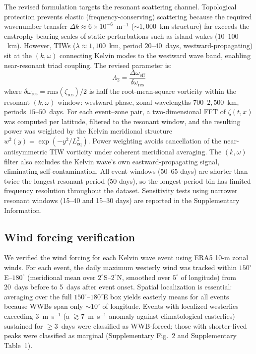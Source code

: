 \documentclass[11pt]{article}
\begin{document}
The revised formulation targets the resonant scattering channel. Topological protection prevents elastic (frequency-conserving) scattering because the required wavenumber transfer $\Delta k \approx 6 \times 10^{-6}$~m$^{-1}$ (${\sim}1{,}000$~km structure) far exceeds the enstrophy-bearing scales of static perturbations such as island wakes ($10$--$100$~km). However, TIWs ($\lambda \approx 1{,}100$~km, period $20$--$40$~days, westward-propagating) sit at the $(k, \omega)$ connecting Kelvin modes to the westward wave band, enabling near-resonant triad coupling\cite{Lyman2005}. The revised parameter is:
\begin{equation}
\Lambda_2 = \frac{\Delta\omega_\mathrm{eff}}{\delta\omega_\mathrm{res}}
\label{eq:lambda2}
\end{equation}
where $\delta\omega_\mathrm{res} = \mathrm{rms}(\zeta_\mathrm{res}) / 2$ is half the root-mean-square vorticity within the resonant $(k, \omega)$ window: westward phase, zonal wavelengths $700$--$2{,}500$~km, periods $15$--$50$~days. For each event--zone pair, a two-dimensional FFT of $\zeta(t, x)$ was computed per latitude, filtered to the resonant window, and the resulting power was weighted by the Kelvin meridional structure $w^2(y) = \exp(-y^2 / L_\mathrm{eq}^2)$. Power weighting avoids cancellation of the near-antisymmetric TIW vorticity under coherent meridional averaging. The $(k, \omega)$ filter also excludes the Kelvin wave's own eastward-propagating signal, eliminating self-contamination. All event windows (50--65 days) are shorter than twice the longest resonant period (50 days), so the longest-period bin has limited frequency resolution throughout the dataset. Sensitivity tests using narrower resonant windows (15--40 and 15--30 days) are reported in the Supplementary Information.

\subsection{Wind forcing verification}

We verified the wind forcing for each Kelvin wave event using ERA5 10-m zonal winds. For each event, the daily maximum westerly wind was tracked within $150^\circ$E--$180^\circ$ (meridional mean over $2^\circ$S--$2^\circ$N, smoothed over $5^\circ$ of longitude) from 20~days before to 5~days after event onset. Spatial localization is essential: averaging over the full $150^\circ$--$180^\circ$E box yields easterly means for all events because WWBs span only ${\sim}10^\circ$ of longitude. Events with localized westerlies exceeding 3~m~s$^{-1}$ (a ${\gtrsim}7$~m~s$^{-1}$ anomaly against climatological easterlies) sustained for $\geq 3$~days were classified as WWB-forced; those with shorter-lived peaks were classified as marginal (Supplementary Fig.~2 and Supplementary Table~1).
\end{document}
